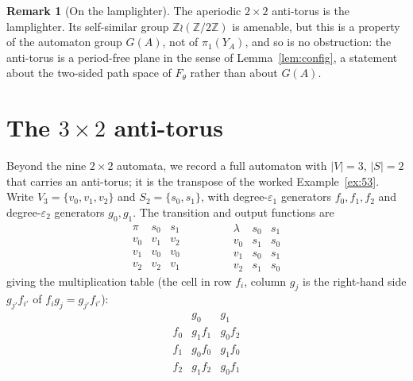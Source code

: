 \documentclass[11pt,reqno]{amsart}
\theoremstyle{plain}
\theoremstyle{definition}
\newtheorem{remark}[theorem]{Remark}
\newcommand{\ZZ}{\mathbb{Z}}
\newcommand{\eps}{\varepsilon}
\begin{document}
\begin{remark}[On the lamplighter]\label{rem:lamp-app}
The aperiodic $2\times2$ anti-torus is the lamplighter. Its self-similar group $\ZZ\wr(\ZZ/2\ZZ)$ is
amenable, but this is a property of the automaton group $G(A)$, not of $\pi_1(Y_A)$,
and so is no obstruction: the anti-torus is a period-free plane in the sense of
Lemma~\ref{lem:config}, a statement about the two-sided path space of $F_\theta$
rather than about $G(A)$. 
\end{remark}

\section{The \texorpdfstring{$3\times2$}{3x2} anti-torus}\label{app:3x2}

Beyond the nine $2\times2$ automata, we record a full automaton with $|V|=3$,
$|S|=2$ that carries an anti-torus; it is the transpose of the worked
Example~\ref{ex:53}. Write $V_3=\{v_0,v_1,v_2\}$ and $S_2=\{s_0,s_1\}$, with
degree-$\eps_1$ generators $f_0,f_1,f_2$ and degree-$\eps_2$ generators $g_0,g_1$.
The transition and output functions are
\[
\begin{array}{c|cc}
\pi & s_0 & s_1\\\hline
v_0 & v_1 & v_2\\
v_1 & v_0 & v_0\\
v_2 & v_2 & v_1
\end{array}
\qquad\qquad
\begin{array}{c|cc}
\lambda & s_0 & s_1\\\hline
v_0 & s_1 & s_0\\
v_1 & s_0 & s_1\\
v_2 & s_1 & s_0
\end{array}
\]
giving the multiplication table (the cell in row $f_i$, column $g_j$ is the
right-hand side $g_{j'}f_{i'}$ of $f_ig_j=g_{j'}f_{i'}$):
\[
\renewcommand{\arraystretch}{1.2}
\begin{array}{c|cc}
 & g_0 & g_1\\\hline
f_0 & g_1f_1 & g_0f_2\\
f_1 & g_0f_0 & g_1f_0\\
f_2 & g_1f_2 & g_0f_1
\end{array}
\]
\end{document}
